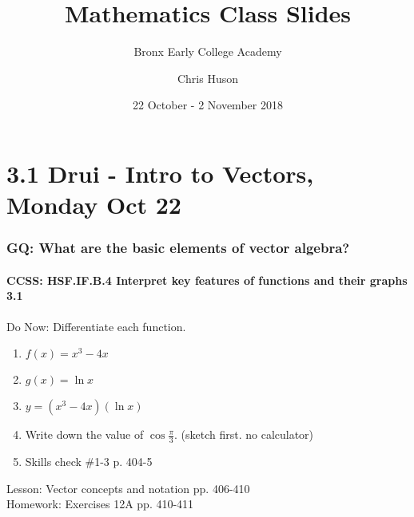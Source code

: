 \documentclass{beamer}
\title{Mathematics Class Slides}
\subtitle{Bronx Early College Academy}
\author{Chris Huson}
\date{22 October - 2 November 2018}
\begin{document}
\frame{\titlepage}

\section[Outline]{}
\frame{\tableofcontents}


\section{3.1 Drui - Intro to Vectors, Monday Oct 22}
  \frame
  {
    \frametitle{GQ: What are the basic elements of vector algebra?}
    \framesubtitle{CCSS: HSF.IF.B.4 Interpret key features of functions and their graphs \qquad \alert{3.1}}

    \begin{block}{Do Now: Differentiate each function.}
    \begin{enumerate}
        \item $f(x)=x^3-4x$
        \item $g(x)=\ln x$
        \item $y=(x^3-4x)(\ln x)$
        \item Write down the value of $\displaystyle \cos \frac{\pi}{3}$. (sketch first. no calculator)
        \item Skills check \#1-3 p. 404-5
    \end{enumerate}
    \end{block}
    Lesson: Vector concepts and notation pp. 406-410\\ \bigskip
    Homework: Exercises 12A pp. 410-411
  }
\end{document}
